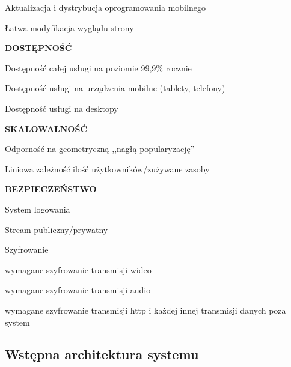 \begin{packed_item}
{\begin{packed_item}
            \item{Aktualizacja i dystrybucja oprogramowania mobilnego}
            \item{Łatwa modyfikacja wyglądu strony}
        \end{packed_item}
    }
    \item{
        \textbf{DOSTĘPNOŚĆ}
        \begin{packed_item}
            \item{Dostępność całej usługi na poziomie 99,9\% rocznie}
            \item{Dostępność usługi na urządzenia mobilne (tablety, telefony)}
            \item{Dostępność usługi na desktopy}
        \end{packed_item}
    }
    \item{
        \textbf{SKALOWALNOŚĆ}
        \begin{packed_item}
            \item{Odporność na geometryczną ,,nagłą popularyzację''}
            \item{Liniowa zależność ilość użytkowników/zużywane zasoby}
        \end{packed_item}
    }
    \item{
        \textbf{BEZPIECZEŃSTWO}
        \begin{packed_item}
            \item{
                System logowania
            }
            \item{
                Stream publiczny/prywatny
            }
            \item{
                Szyfrowanie
                \begin{packed_item}
                    \item{wymagane szyfrowanie transmisji wideo}
                    \item{wymagane szyfrowanie transmisji audio}
                    \item{wymagane szyfrowanie transmisji http i każdej innej transmisji danych poza system}
                \end{packed_item}
            }
        \end{packed_item}
    }
\end{packed_item}

\subsection{Wstępna architektura systemu}

